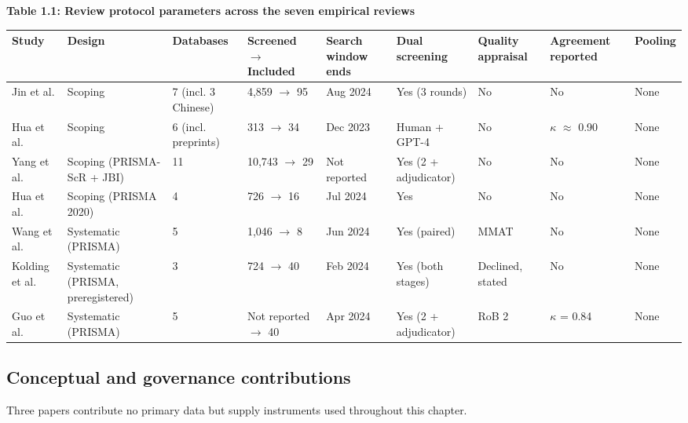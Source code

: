 \documentclass[11pt]{article}
\begin{document}
	\begin{center}
		\textbf{Table 1.1: Review protocol parameters across the seven empirical reviews}
		\vspace{2pt}
		
		\tiny
		\setlength{\tabcolsep}{2pt}\renewcommand{\arraystretch}{1.1}
		\begin{tabularx}{\textwidth}{|X|X|X|X|X|X|X|X|X|}
			\hline
			\textbf{Study} & \textbf{Design} & \textbf{Databases} & \textbf{Screened $\rightarrow$ Included} & \textbf{Search window ends} & \textbf{Dual screening} & \textbf{Quality appraisal} & \textbf{Agreement reported} & \textbf{Pooling} \\
			\hline
			Jin et al.\cite{Jin2025LLMMentalHealth} & Scoping & 7 (incl. 3 Chinese) & 4,859 $\rightarrow$ 95 & Aug 2024 & Yes (3 rounds) & No & No & None \\
			\hline
			Hua et al.\cite{Hua2025LLMMentalHealthScoping} & Scoping & 6 (incl. preprints) & 313 $\rightarrow$ 34 & Dec 2023 & Human + GPT-4 & No & $\kappa$ $\approx$ 0.90 & None \\
			\hline
			Yang et al.\cite{fpsyg.2025.1715306} & Scoping (PRISMA-ScR + JBI) & 11 & 10,743 $\rightarrow$ 29 & Not reported & Yes (2 + adjudicator) & No & No & None \\
			\hline
			Hua et al.\cite{Hua2025} & Scoping (PRISMA 2020) & 4 & 726 $\rightarrow$ 16 & Jul 2024 & Yes & No & No & None \\
			\hline
			Wang et al.\cite{WANG2025} & Systematic (PRISMA) & 5 & 1,046 $\rightarrow$ 8 & Jun 2024 & Yes (paired) & MMAT & No & None \\
			\hline
			Kolding et al.\cite{Kolding2025} & Systematic (PRISMA, preregistered) & 3 & 724 $\rightarrow$ 40 & Feb 2024 & Yes (both stages) & Declined, stated & No & None \\
			\hline
			Guo et al.\cite{GUO2024} & Systematic (PRISMA) & 5 & Not reported $\rightarrow$ 40 & Apr 2024 & Yes (2 + adjudicator) & RoB 2 & $\kappa$ = 0.84 & None \\
			\hline
		\end{tabularx}
	\end{center}
	
	\subsection{Conceptual and governance contributions}
	
	Three papers contribute no primary data but supply instruments used throughout this chapter.
	
\end{document}
